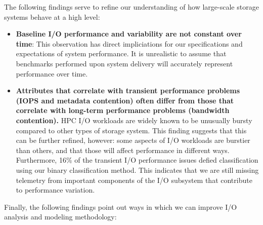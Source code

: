 The following findings serve to refine our understanding of how large-scale storage
systems behave at a high level: 

\begin{itemize}

\item \textbf{Baseline I/O performance and variability are not constant over
time}: This observation has direct impliciations for our specifications and
expectations of system performance.  It is unrealistic to assume that
benchmarks performed upon system delivery will accurately represent
performance over time.

\item \textbf{Attributes that correlate with transient performance problems (IOPS
and metadata contention) often differ from those that correlate with
long-term performance problems (bandwidth contention).} HPC I/O workloads
are widely known to be unusually bursty compared to other types of storage
system. This finding suggests that this can be further refined, however:
some aspects of I/O workloads are burstier than others, and that those
will affect performance in different ways.  Furthermore, 16\% of the transient I/O performance issues defied classification using our binary classification method.
This indicates that we are still missing telemetry from important components of the I/O subsystem that contribute to performance variation. 

\end{itemize}

Finally, the following findings point out ways in which we can improve
I/O analysis and modeling methodology:


